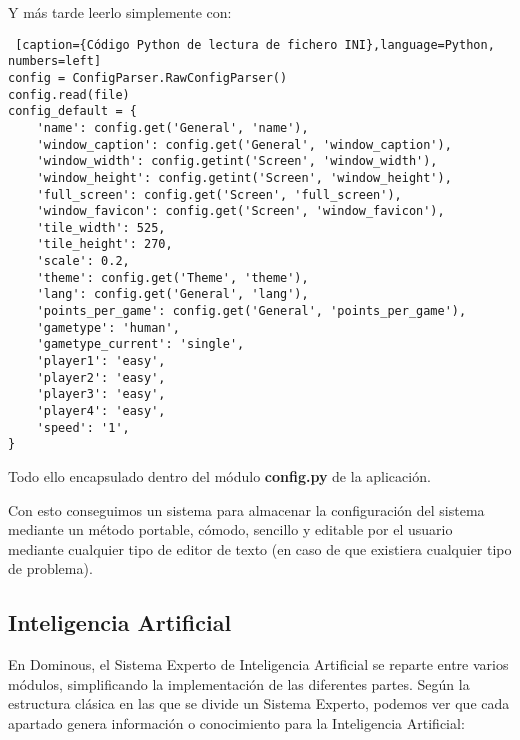 Y más tarde leerlo simplemente con:

\begin{lstlisting} [caption={Código Python de lectura de fichero INI},language=Python, numbers=left]
config = ConfigParser.RawConfigParser()
config.read(file)
config_default = {
    'name': config.get('General', 'name'),
    'window_caption': config.get('General', 'window_caption'),
    'window_width': config.getint('Screen', 'window_width'),
    'window_height': config.getint('Screen', 'window_height'),
    'full_screen': config.get('Screen', 'full_screen'),
    'window_favicon': config.get('Screen', 'window_favicon'),
    'tile_width': 525,
    'tile_height': 270,
    'scale': 0.2,
    'theme': config.get('Theme', 'theme'),
    'lang': config.get('General', 'lang'),
    'points_per_game': config.get('General', 'points_per_game'),
    'gametype': 'human',
    'gametype_current': 'single',
    'player1': 'easy',
    'player2': 'easy',
    'player3': 'easy',
    'player4': 'easy',
    'speed': '1',
}
\end{lstlisting}

Todo ello encapsulado dentro del módulo \textbf{config.py} de la aplicación.

Con esto conseguimos un sistema para almacenar la configuración del sistema mediante un método portable, cómodo, sencillo y 
editable por el usuario mediante cualquier tipo de editor de texto (en caso de que existiera cualquier tipo de problema).

\subsection{Inteligencia Artificial}

En Dominous, el Sistema Experto de Inteligencia Artificial se reparte entre varios módulos, simplificando la implementación
de las diferentes partes. Según la estructura clásica en las que se divide un Sistema Experto, podemos ver que cada
apartado genera información o conocimiento para la Inteligencia Artificial:

